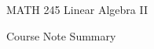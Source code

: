 \documentclass[math_245.tex]{subfiles}
\begin{document}
    \begin{titlepage}
    \centering
    \vspace*{7cm}
    {\serifastd\huge MATH 245 Linear Algebra II \par}
    \vspace{1cm}
    {\serifastd\Large Course Note Summary\par}
    \vspace{3.5cm}
    \algebraicon
    \vspace*{\fill}
    \cleardoublepage
    \end{titlepage}

    \toc
\end{document}
